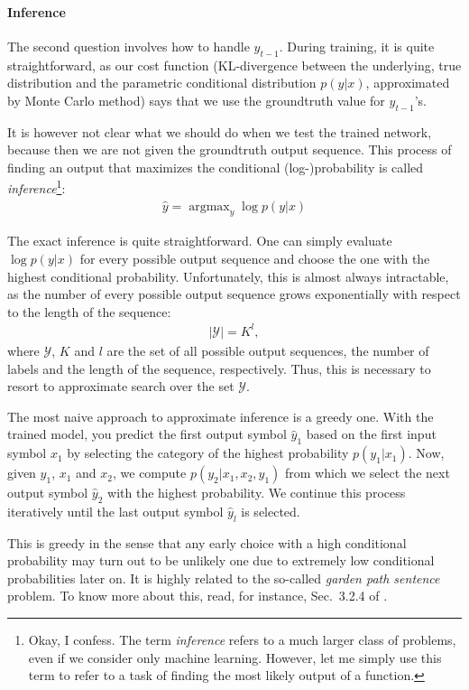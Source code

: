 \documentclass{report}
\newcommand{\YY}[0]{\mathcal{Y}}
\DeclareMathOperator*{\argmax}{\arg \max}
\begin{document}
\paragraph{Inference}
The second question involves how to handle $y_{t-1}$. During training, it is
quite straightforward, as our cost function (KL-divergence between the
underlying, true distribution and the parametric conditional distribution
$p(y|x)$, approximated by Monte Carlo method) says that we use the groundtruth
value for $y_{t-1}$'s. 

It is however not clear what we should do when we test the trained network,
because then we are not given the groundtruth output sequence. This process of
finding an output that maximizes the conditional (log-)probability is called
{\em inference}\footnote{
    Okay, I confess. The term {\em inference} refers to a much larger class of
    problems, even if we consider only machine learning. However, let me simply
    use this term to refer to a task of finding the most likely output of a
    function.
}:
\begin{align*}
    \hat{y} = \argmax_y \log p(y|x)
\end{align*}

The exact inference is quite straightforward. One can simply evaluate $\log
p(y|x)$ for every possible output sequence and choose the one with the highest
conditional probability. Unfortunately, this is almost always intractable, as
the number of every possible output sequence grows exponentially with respect to
the length of the sequence:
\begin{align*}
    |\YY| = K^l,
\end{align*}
where $\YY$, $K$ and $l$ are the set of all possible output sequences, the
number of labels and the length of the sequence, respectively. Thus, this is
necessary to resort to approximate search over the set $\YY$.

The most naive approach to approximate inference is a greedy one. With the
trained model, you predict the first output symbol $\hat{y}_1$ based on the
first input symbol $x_1$ by selecting the category of the highest probability
$p(y_1|x_1)$. Now, given $\hat{y}_1$, $x_1$ and $x_2$, we compute
$p(y_2|x_1,x_2,y_1)$ from which we select the next output symbol $\hat{y}_2$
with the highest probability. We continue this process iteratively until the
last output symbol $\hat{y}_l$ is selected.

This is greedy in the sense that any early choice with a high conditional
probability may turn out to be unlikely one due to extremely low conditional
probabilities later on. It is highly related to the so-called {\em garden path
sentence} problem. To know more about this, read, for instance, Sec.~3.2.4 of
\cite{manning1999foundations}.
\end{document}
